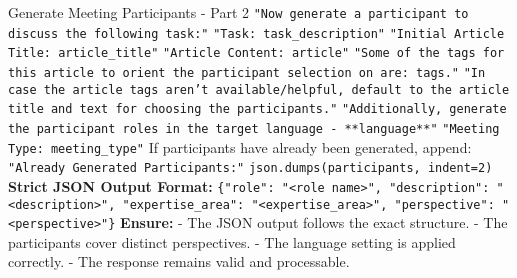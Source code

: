 \begin{figure*}[t]
\begin{AIbox}{Generate Meeting Participants - Part 2}
{        \texttt{"Now generate a participant to discuss the following task:"} \newline
        \texttt{"Task: {task\_description}"} \newline
        \texttt{"Initial Article Title: {article\_title}"} \newline
        \texttt{"Article Content: {article}"} \newline
        \texttt{"Some of the tags for this article to orient the participant selection on are: {tags}."} \newline
        \texttt{"In case the article tags aren't available/helpful, default to the article title and text for choosing the participants."} \newline
        \texttt{"Additionally, generate the participant roles in the target language - **{language}**"} \newline
        \texttt{"Meeting Type: {meeting\_type}"} \newline
        If participants have already been generated, append: \newline
        \texttt{"Already Generated Participants:"} \newline
        \texttt{{json.dumps(participants, indent=2)}} \newline
        \textbf{Strict JSON Output Format:} \newline
        \texttt{\{"role": "<role name>", "description": "<description>", "expertise\_area": "<expertise\_area>", "perspective": "<perspective>"\}} \newline
        \textbf{Ensure:} \newline
        - The JSON output follows the exact structure. \newline
        - The participants cover distinct perspectives. \newline
        - The language setting is applied correctly. \newline
        - The response remains valid and processable.
    }
    \end{AIbox}
    \caption{Prompt template for generating diverse, role-based meeting participants in structured JSON format (Part 2).}
    \label{fig:meeting_participants_prompt_p2}
\end{figure*}



